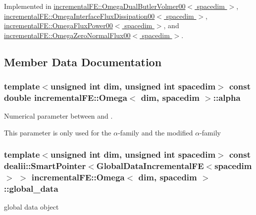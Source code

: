 Implemented in \hyperlink{classincremental_f_e_1_1_omega_dual_butler_volmer00_af5cc5ae73af89acdea968203cb29e415}{incremental\+F\+E\+::\+Omega\+Dual\+Butler\+Volmer00$<$ spacedim $>$}, \hyperlink{classincremental_f_e_1_1_omega_interface_flux_dissipation00_a827b1a06021fa3853effb9e893488058}{incremental\+F\+E\+::\+Omega\+Interface\+Flux\+Dissipation00$<$ spacedim $>$}, \hyperlink{classincremental_f_e_1_1_omega_flux_power00_a6e690e461414dbedeef9035a656cc20b}{incremental\+F\+E\+::\+Omega\+Flux\+Power00$<$ spacedim $>$}, and \hyperlink{classincremental_f_e_1_1_omega_zero_normal_flux00_a2b27754a7083466923fe6eac25dfc0fd}{incremental\+F\+E\+::\+Omega\+Zero\+Normal\+Flux00$<$ spacedim $>$}.



\subsection{Member Data Documentation}
\subsubsection[{\texorpdfstring{alpha}{alpha}}]{\setlength{\rightskip}{0pt plus 5cm}template$<$unsigned int dim, unsigned int spacedim$>$ const double {\bf incremental\+F\+E\+::\+Omega}$<$ dim, spacedim $>$\+::alpha\hspace{0.3cm}{\ttfamily [private]}}\hypertarget{classincremental_f_e_1_1_omega_a891688560ec0ad8dc5a0058a7b400269}{}\label{classincremental_f_e_1_1_omega_a891688560ec0ad8dc5a0058a7b400269}
Numerical parameter between {} and {}.

This parameter is only used for the $\alpha$-\/family and the modified $\alpha$-\/family 
\subsubsection[{\texorpdfstring{global\+\_\+data}{global_data}}]{\setlength{\rightskip}{0pt plus 5cm}template$<$unsigned int dim, unsigned int spacedim$>$ const dealii\+::\+Smart\+Pointer$<${\bf Global\+Data\+Incremental\+FE}$<$spacedim$>$ $>$ {\bf incremental\+F\+E\+::\+Omega}$<$ dim, spacedim $>$\+::global\+\_\+data\hspace{0.3cm}{\ttfamily [private]}}\hypertarget{classincremental_f_e_1_1_omega_abd23d288a7a4a43f9b528be968cd2113}{}\label{classincremental_f_e_1_1_omega_abd23d288a7a4a43f9b528be968cd2113}
global data object 
